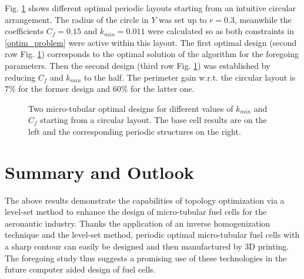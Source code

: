 \documentclass{article}
\begin{document}
Fig. \ref{homogenized} shows different optimal periodic layouts starting from an intuitive circular arrangement. The radius of the circle in $Y$ was set up to $r=0.3$, meanwhile the coefficients $C_f=0.15$ and $k_{min}=0.011$ were calculated so as both constraints in \eqref{optim_problem} were active within this layout. The first optimal design (second row Fig. \ref{homogenized}) corresponds to the optimal solution of the algorithm for the foregoing parameters. Then the second design (third row Fig. \ref{homogenized}) was established by reducing $C_f$ and $k_{min}$ to the half. The perimeter gain w.r.t. the circular layout is $7\%$ for the former design and $60\%$ for the latter one.\\



\begin{figure}[h]
\centering
{}
\caption{Two micro-tubular optimal designs for different values of $k_{min}$ and $C_f$ starting from a circular layout. The base cell results are on the left and the corresponding periodic structures on the right.}\label{homogenized}
\end{figure}

{\section{Summary and Outlook}}

The above results demonstrate the capabilities of topology optimization via a level-set method to enhance the design of micro-tubular fuel cells for the aeronautic industry. Thanks the application of an inverse homogenization technique and the level-set method, periodic optimal micro-tubular fuel cells with a sharp contour can easily be designed and then manufactured by 3D printing. The foregoing study thus suggests a promising use of these technologies in the future  computer aided design of fuel cells.\\
\end{document}
